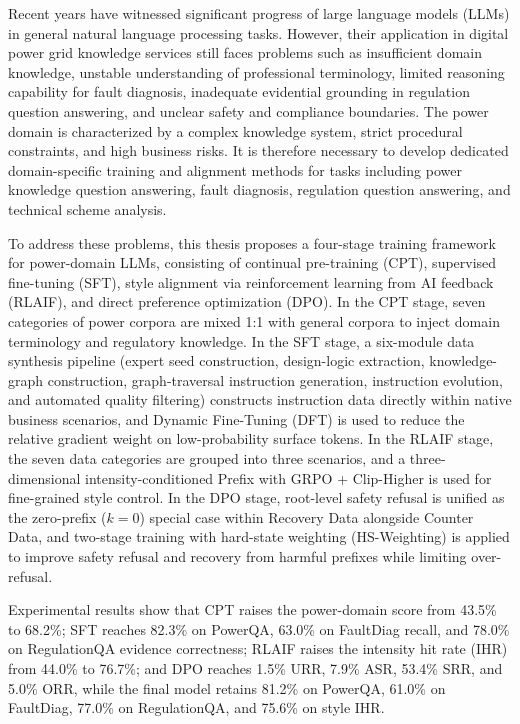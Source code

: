 \documentclass[fontset=fandol,type=master,campus=shenzhen,etitleauto=true]{hithesisbook}
\begin{document}
\begin{eabstract}
Recent years have witnessed significant progress of large language models (LLMs) in general natural language processing tasks. However, their application in digital power grid knowledge services still faces problems such as insufficient domain knowledge, unstable understanding of professional terminology, limited reasoning capability for fault diagnosis, inadequate evidential grounding in regulation question answering, and unclear safety and compliance boundaries. The power domain is characterized by a complex knowledge system, strict procedural constraints, and high business risks. It is therefore necessary to develop dedicated domain-specific training and alignment methods for tasks including power knowledge question answering, fault diagnosis, regulation question answering, and technical scheme analysis.

To address these problems, this thesis proposes a four-stage training framework for power-domain LLMs, consisting of continual pre-training (CPT), supervised fine-tuning (SFT), style alignment via reinforcement learning from AI feedback (RLAIF), and direct preference optimization (DPO). In the CPT stage, seven categories of power corpora are mixed 1:1 with general corpora to inject domain terminology and regulatory knowledge. In the SFT stage, a six-module data synthesis pipeline (expert seed construction, design-logic extraction, knowledge-graph construction, graph-traversal instruction generation, instruction evolution, and automated quality filtering) constructs instruction data directly within native business scenarios, and Dynamic Fine-Tuning (DFT) is used to reduce the relative gradient weight on low-probability surface tokens. In the RLAIF stage, the seven data categories are grouped into three scenarios, and a three-dimensional intensity-conditioned Prefix with GRPO + Clip-Higher is used for fine-grained style control. In the DPO stage, root-level safety refusal is unified as the zero-prefix ($k=0$) special case within Recovery Data alongside Counter Data, and two-stage training with hard-state weighting (HS-Weighting) is applied to improve safety refusal and recovery from harmful prefixes while limiting over-refusal.

Experimental results show that CPT raises the power-domain score from 43.5\% to 68.2\%; SFT reaches 82.3\% on PowerQA, 63.0\% on FaultDiag recall, and 78.0\% on RegulationQA evidence correctness; RLAIF raises the intensity hit rate (IHR) from 44.0\% to 76.7\%; and DPO reaches 1.5\% URR, 7.9\% ASR, 53.4\% SRR, and 5.0\% ORR, while the final model retains 81.2\% on PowerQA, 61.0\% on FaultDiag, 77.0\% on RegulationQA, and 75.6\% on style IHR.
\end{eabstract}
\end{document}
